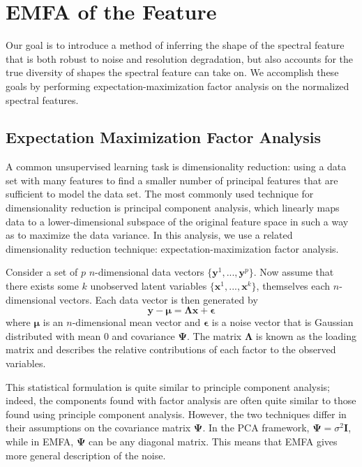 \section{EMFA of the \siliconii\; Feature}
\label{method}
Our goal is to introduce a method of inferring the shape of the spectral feature that is both robust to noise and resolution degradation, but also accounts for the true diversity of shapes the spectral feature can take on. We accomplish these goals by performing expectation-maximization factor analysis on the normalized spectral features.

\subsection{Expectation Maximization Factor Analysis}
A common unsupervised learning task is dimensionality reduction: using a data set with many features to find a smaller number of principal features that are sufficient to model the data set. The most commonly used technique for dimensionality reduction is principal component analysis, which linearly maps data to a lower-dimensional subspace of the original feature space in such a way as to maximize the data variance. In this analysis, we use a related dimensionality reduction technique: expectation-maximization factor analysis.

Consider a set of $p$ $n$-dimensional data vectors $\{\bm{y}^1, ..., \bm{y}^p\}$. Now assume that there exists some $k$ unobserved latent variables $\{\bm{x}^1, ..., \bm{x}^k\}$, themselves each $n$-dimensional vectors. Each data vector is then generated by
\begin{equation}
\bm{y} - \bm{\mu} = \bm{\Lambda}\bm{x}+\bm{\epsilon}
\end{equation}
where $\bm{\mu}$ is an $n$-dimensional mean vector and $\bm{\epsilon}$ is a noise vector that is Gaussian distributed with mean 0 and covariance $\bm{\Psi}$. The matrix $\bm{\Lambda}$ is known as the loading matrix and describes the relative contributions of each factor to the observed variables.

This statistical formulation is quite similar to principle component analysis; indeed, the components found with factor analysis are often quite similar to those found using principle component analysis. However, the two techniques differ in their assumptions on the covariance matrix $\bm{\Psi}$. In the PCA framework, $\bm{\Psi}=\sigma^2\bm{I}$, while in EMFA, $\bm{\Psi}$ can be any diagonal matrix. This means that EMFA gives more general description of the noise.

